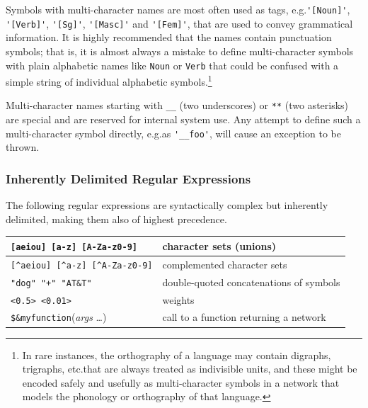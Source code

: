 \documentclass[letterpaper,12pt]{article}
\begin{document}
Symbols with multi-character names are most often used as tags, e.g.\@ \verb!'[Noun]'!,
\verb!'[Verb]'!, \verb!'[Sg]'!, \verb!'[Masc]'! and \verb!'[Fem]'!, that are used to convey
grammatical information.  It is highly recommended that the names contain punctuation symbols;
that is, it is almost always a mistake to define multi-character symbols
with plain alphabetic 
names like \verb!Noun! or \verb!Verb! 
that could be confused with a simple string of individual alphabetic
symbols.\footnote{In rare instances, the orthography of a language may contain digraphs,
trigraphs, etc.\@ that are always treated as indivisible units, and these might be
encoded safely and usefully as multi-character symbols in a network that models the
phonology or orthography of that language.}

Multi-character names starting with \verb!__! (two underscores) or \verb!**! (two asterisks) are
special and are reserved for internal system use.  Any attempt to define such a
multi-character symbol directly, e.g.\@ as \verb!'__foo'!, will cause an exception to be
thrown.

\subsubsection{Inherently Delimited Regular Expressions}

The following regular expressions are syntactically complex but
inherently delimited, making them also of highest precedence.

\vspace{0.5cm}

\noindent
\begin{tabular}{|l|p{6.2cm}|}
\hline
\verb![aeiou] [a-z] [A-Za-z0-9]! & character sets (unions)\\
\hline
\verb![^aeiou] [^a-z] [^A-Za-z0-9]! & complemented character sets\\
\hline
\verb!"dog" "+" "AT&T"! & double-quoted concatenations of symbols\\
\hline
\verb!<0.5> <0.01>! &  weights\\
\hline
\verb!$&myfunction!(\textit{args} \ldots) & call to a function returning a network\\
\hline
\end{tabular}

\vspace{0.5cm}
\end{document}
